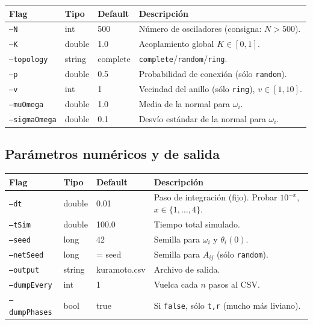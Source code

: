 \documentclass[11pt,a4paper]{article}
\begin{document}
\begin{center}
\renewcommand{\arraystretch}{1.2}
\begin{tabular}{@{}l l l p{7.7cm}@{}}
\toprule
\textbf{Flag} & \textbf{Tipo} & \textbf{Default} & \textbf{Descripción} \\
\midrule
\texttt{--N} & int & 500 & Número de osciladores (consigna: $N>500$). \\
\texttt{--K} & double & 1.0 & Acoplamiento global $K\in[0,1]$. \\
\texttt{--topology} & string & complete & \texttt{complete}/\texttt{random}/\texttt{ring}. \\
\texttt{--p} & double & 0.5 & Probabilidad de conexión (sólo \texttt{random}). \\
\texttt{--v} & int & 1 & Vecindad del anillo (sólo \texttt{ring}), $v\in[1,10]$. \\
\texttt{--muOmega} & double & 1.0 & Media de la normal para $\omega_i$. \\
\texttt{--sigmaOmega} & double & 0.1 & Desvío estándar de la normal para $\omega_i$. \\
\bottomrule
\end{tabular}
\end{center}

\subsection*{Parámetros numéricos y de salida}

\begin{center}
\renewcommand{\arraystretch}{1.2}
\begin{tabular}{@{}l l l p{7.7cm}@{}}
\toprule
\textbf{Flag} & \textbf{Tipo} & \textbf{Default} & \textbf{Descripción} \\
\midrule
\texttt{--dt} & double & 0.01 & Paso de integración (fijo). Probar $10^{-x}$, $x\in\{1,\ldots,4\}$. \\
\texttt{--tSim} & double & 100.0 & Tiempo total simulado. \\
\texttt{--seed} & long & 42 & Semilla para $\omega_i$ y $\theta_i(0)$. \\
\texttt{--netSeed} & long & = seed & Semilla para $A_{ij}$ (sólo \texttt{random}). \\
\texttt{--output} & string & kuramoto.csv & Archivo de salida. \\
\texttt{--dumpEvery} & int & 1 & Vuelca cada $n$ pasos al CSV. \\
\texttt{--dumpPhases} & bool & true & Si \texttt{false}, sólo \texttt{t,r} (mucho más liviano). \\
\bottomrule
\end{tabular}
\end{center}
\end{document}
